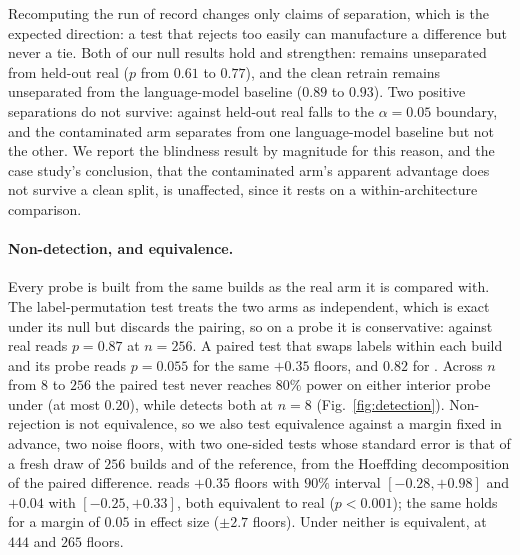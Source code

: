 Recomputing the run of record changes only claims of separation, which is the
expected direction: a test that rejects too easily can manufacture a difference
but never a tie. Both of our null results hold and strengthen: \solidify{}
remains unseparated from held-out real ($p$ from $0.61$ to $0.77$), and the clean
retrain remains unseparated from the language-model baseline ($0.89$ to $0.93$).
Two positive separations do not survive: \traincopy{} against held-out real falls
to the $\alpha{=}0.05$ boundary, and the contaminated arm separates from one
language-model baseline but not the other. We report the blindness result by
magnitude for this reason, and the case study's conclusion, that the contaminated
arm's apparent advantage does not survive a clean split, is
unaffected, since it rests on a within-architecture comparison.

\paragraph{Non-detection, and equivalence.} Every probe is built from the same builds as the
real arm it is compared with. The label-permutation test treats the two arms as independent,
which is exact under its null but discards the pairing, so on a probe it is conservative:
\solidify{} against real reads $p{=}0.87$ at $n{=}256$. A paired test that swaps labels
within each build and its probe reads $p{=}0.055$ for the same $+0.35$ floors, and $0.82$ for
\hollow{}. Across $n$ from $8$ to $256$ the paired test never reaches $80\%$ power on either
interior probe under \mvkid{} (at most $0.20$), while \vkid{} detects both at $n{=}8$
(Fig.~\ref{fig:detection}). Non-rejection is not equivalence, so we also test equivalence
against a margin fixed in advance, two noise floors, with two one-sided tests whose standard
error is that of a fresh draw of $256$ builds and of the reference, from the Hoeffding
decomposition of the paired difference. \solidify{} reads $+0.35$ floors with $90\%$
interval $[-0.28, +0.98]$ and \hollow{} $+0.04$ with $[-0.25, +0.33]$, both equivalent to real
($p{<}0.001$); the same holds for a margin of $0.05$ in effect size ($\pm 2.7$ floors). Under
\vkid{} neither is equivalent, at $444$ and $265$ floors.

